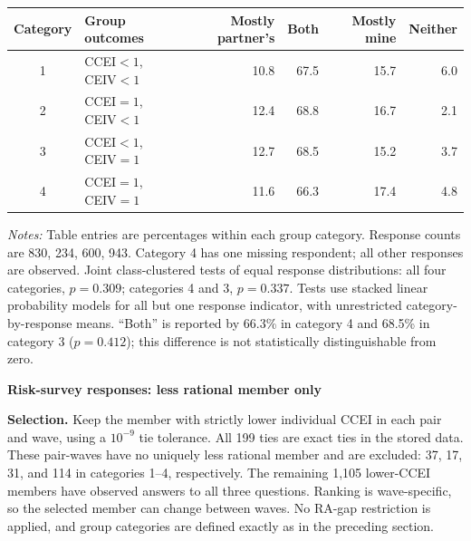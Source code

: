 \documentclass[11pt]{article}
\begin{document}
\begin{center}\begin{tabular}{clrrrr}\toprule
Category & Group outcomes & Mostly partner's & Both & Mostly mine & Neither\\\midrule
1 & CCEI$<1$, CEIV$<1$ & 10.8 & 67.5 & 15.7 & 6.0\\
2 & CCEI$=1$, CEIV$<1$ & 12.4 & 68.8 & 16.7 & 2.1\\
3 & CCEI$<1$, CEIV$=1$ & 12.7 & 68.5 & 15.2 & 3.7\\
4 & CCEI$=1$, CEIV$=1$ & 11.6 & 66.3 & 17.4 & 4.8\\
\bottomrule\end{tabular}\end{center}
\textit{Notes:} Table entries are percentages within each group category. Response counts are 830, 234, 600, 943. Category 4 has one missing respondent; all other responses are observed. Joint class-clustered tests of equal response distributions: all four categories, $p=0.309$; categories 4 and 3, $p=0.337$. Tests use stacked linear probability models for all but one response indicator, with unrestricted category-by-response means.
``Both'' is reported by 66.3\% in category 4 and 68.5\% in category 3 ($p=0.412$); this difference is not statistically distinguishable from zero.
\clearpage
\begin{center}\Large\textbf{Risk-survey responses: less rational member only}\end{center}
\textbf{Selection.} Keep the member with strictly lower individual CCEI in each pair and wave, using a $10^{-9}$ tie tolerance.
All 199 ties are exact ties in the stored data. These pair-waves have no uniquely less rational member and are excluded:
37, 17, 31, and 114 in categories 1--4, respectively. The remaining 1,105 lower-CCEI members have observed answers to
all three questions. Ranking is wave-specific, so the selected member can change between waves. No RA-gap restriction
is applied, and group categories are defined exactly as in the preceding section.
\end{document}
